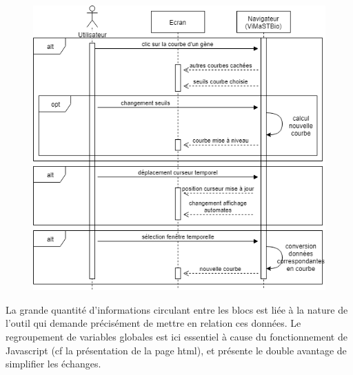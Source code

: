 \begin{figure}[!h]
  \bigbreak
  \centering
  \includegraphics[scale = .4]{images/sequence.png}
\end{figure}
\bigbreak
La grande quantité d’informations circulant entre les blocs est liée à la nature de l’outil qui demande précisément de mettre en relation ces données. Le regroupement de variables globales est ici essentiel à cause du fonctionnement de Javascript (cf la présentation de la page html), et présente le double avantage de simplifier les échanges.
